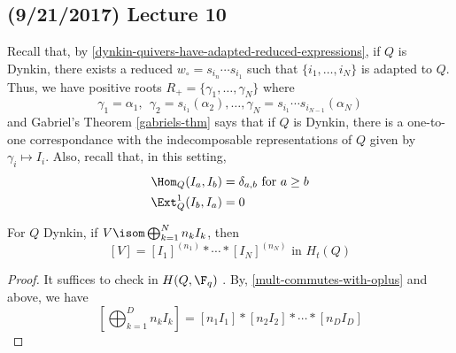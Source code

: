 \documentclass[11pt,leqno,oneside]{amsbook}
\numberwithin{thm}{section}
\renewcommand{\Q}{Q} %
\newcommand{\roots}{R} %
\begin{document}
\subsection*{(9/21/2017) Lecture 10}
Recall that, by \ref{dynkin-quivers-have-adapted-reduced-expressions},
if \(\Q\) is Dynkin, there exists a reduced \(w_\circ = 
s_{i_n} \cdots s_{i_1}\) such that \(\{i_1, \ldots, i_N\}\) is adapted
to \(\Q\). Thus, we have positive roots \(\roots_+ = \{\gamma_1,
\ldots, \gamma_N\}\) where \[
  \gamma_1 = \alpha_1, \ \ \gamma_2 = s_{i_1}(\alpha_2), \ldots,
  \gamma_N = s_{i_1} \cdots s_{i_{N-1}}(\alpha_N) 
\] and Gabriel's Theorem \ref{gabriels-thm} says that if \(\Q\) is
Dynkin, there is a one-to-one correspondance with the indecomposable
representations of \(\Q\) given by \(\gamma_i \mapsto I_i\). Also,
recall that, in this setting, 
\begin{align*}
  \Hom_\Q(I_a, I_b) & = \delta_{a,b} \text{ for } a \geq b \\
  \Ext_\Q^1(I_b, I_a) & = 0
\end{align*}
\begin{prop}
  For \(\Q\) Dynkin, if \(V \isom \bigoplus_{k=1}^N n_k I_k\), then \[
    [V] = [I_1]^{(n_1)} * \cdots * [I_N]^{(n_N)} \text{ in } H_t(\Q)
  \]
\end{prop}
\begin{proof}
  It suffices to check in \(H(\Q,\F_q)\) . By, \ref{mult-commutes-with-oplus} and above, we have \[
    \left[ \bigoplus_{k=1}^D n_k I_k \right] = [n_1 I_1] * [n_2 I_2] *
    \cdots * [n_D I_D]
  \]
\end{proof}
\end{document}
